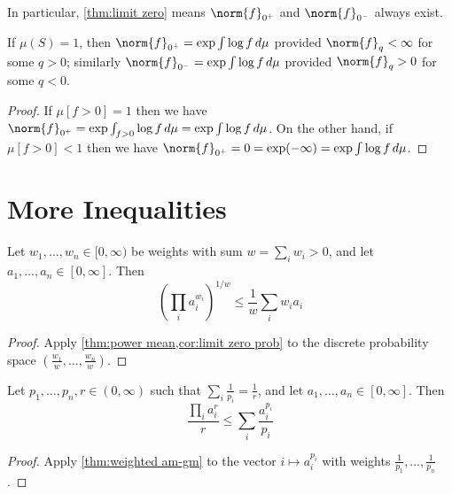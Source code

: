 \documentclass{article}
\begin{document}
In particular, \cref{thm:limit zero} means $\norm{f}_{0^+}$ and $\norm{f}_{0^-}$ always exist.

\begin{corollary}\label{cor:limit zero prob}
  If $\mu(S) = 1$, then $\norm{f}_{0^+} = \exp \int \log f\,d\mu$ provided $\norm{f}_q < \infty$ for some $q > 0$;
  similarly $\norm{f}_{0^-} = \exp \int \log f\,d\mu$ provided $\norm{f}_q > 0$ for some $q < 0$.
\end{corollary}
\begin{proof}
  If $\mu[f > 0] = 1$ then we have $\norm{f}_{0^+} = \exp \int_{f > 0} \log f\,d\mu = \exp \int \log f\,d\mu$.
  On the other hand, if $\mu[f > 0] < 1$ then we have $\norm{f}_{0^+} = 0 = \exp(-\infty) = \exp \int \log f\,d\mu$.
\end{proof}

\section*{More Inequalities}

\begin{lemma}\label{thm:weighted am-gm}
  Let $w_1, \dots, w_n \in [0, \infty)$ be weights with sum $w = \sum_i w_i > 0$,
  and let $a_1, \dots, a_n \in [0, \infty]$.
  Then
  \[\left(\prod_i a_i^{w_i}\right)^{1/w} \le \frac1w \sum_i w_i a_i\]
\end{lemma}
\begin{proof}
  Apply \cref{thm:power mean,cor:limit zero prob} to the discrete probability space $\left(\frac{w_1}{w}, \dots, \frac{w_n}{w}\right)$.
\end{proof}

\begin{corollary}\label{thm:young}
  Let $p_1, \dots, p_n, r \in (0, \infty)$ such that $\sum_i \frac1{p_i} = \frac1r$,
  and let $a_1, \dots, a_n \in [0, \infty]$.
  Then
  \[\frac{\prod_i a_i^r}{r} \le \sum_i \frac{a_i^{p_i}}{p_i}\]
\end{corollary}
\begin{proof}
  Apply \cref{thm:weighted am-gm} to the vector $i \mapsto a_i^{p_i}$ with weights $\frac{1}{p_1}, \dots, \frac{1}{p_n}$.
\end{proof}
\end{document}

